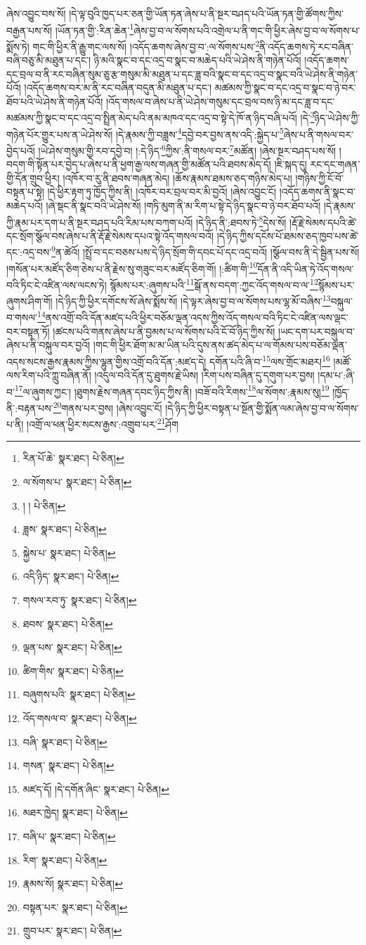 ཞེས་འབྱུང་བས་སོ། །དེ་ལྟ་བུའི་ཁྱད་པར་ཅན་གྱི་ཡོན་ཏན་ཞེས་པ་ནི་སྔར་བཤད་པའི་ཡོན་ཏན་གྱི་ཚོགས་ཀྱིས་བརྒྱན་པས་སོ། །ཡོན་ཏན་གྱི་:རིན་ཆེན་\footnote{རིན་པོ་ཆེ་  སྣར་ཐང་།  པེ་ཅིན། }ཞེས་བྱ་བ་ལ་སོགས་པའི་འགྲེལ་པ་ནི་གང་གི་ཕྱིར་ཞེས་བྱ་བ་ལ་སོགས་པ་སྨོས་ཏེ། གང་གི་ཕྱིར་ནི་རྒྱུ་གང་ལས་སོ། །འདོད་ཆགས་ཞེས་བྱ་བ་:ལ་སོགས་པས་\footnote{ལ་སོགས་པ་  སྣར་ཐང་།  པེ་ཅིན། }ནི་འདོད་ཆགས་ཏེ་རང་བཞིན་བཞི་བཅུ་མི་མཐུན་པ་དང་། ཉི་མའི་སྣང་བ་དང་འདྲ་བ་སྣང་བ་མཆེད་པའི་ཡེ་ཤེས་ནི་གཉེན་པོའོ། །འདོད་ཆགས་དང་བྲལ་བ་ནི་རང་བཞིན་སུམ་ཅུ་རྩ་གསུམ་མི་མཐུན་པ་དང་ཟླ་བའི་སྣང་བ་དང་འདྲ་བ་སྣང་བའི་ཡེ་ཤེས་ནི་གཉེན་པོའོ། །འདོད་ཆགས་བར་མ་ནི་རང་བཞིན་བདུན་མི་མཐུན་པ་དང་། མཚམས་ཀྱི་སྣང་བ་དང་འདྲ་བ་སྣང་བ་ཉེ་བར་ཐོབ་པའི་ཡེ་ཤེས་ནི་གཉེན་པོའོ། །འོད་གསལ་བ་ཞེས་པ་ནི་ཡེ་ཤེས་གསུམ་དང་བྲལ་བས་ཉི་མ་དང་ཟླ་བ་དང་མཚམས་ཀྱི་སྣང་བ་དང་འདྲ་བ་སྤྲིན་མེད་པའི་ནམ་མཁའ་དང་འདྲ་བ་སྟེ་དེ་ཁོ་ན་ཉིད་བཞི་པའོ། །དེ་\footnote{། །  པེ་ཅིན། }ཉིད་ཡེ་ཤེས་ཀྱི་གཉེན་པོར་གྱུར་པས་ན་ཡེ་ཤེས་སོ། །དེ་རྣམས་ཀྱི་བཟླས་\footnote{ཟླས་  སྣར་ཐང་།  པེ་ཅིན། }དབྱེ་བར་བྱས་ནས་འདི་:སྐྱེད་པ་\footnote{སྐྱེས་པ་  སྣར་ཐང་།  པེ་ཅིན། }ཞེས་པ་ནི་གསལ་བར་བྱེད་པའོ། །ཡེ་ཤེས་གསུམ་གྱི་རབ་དབྱེ་བ། །:དེ་ཉིད་\footnote{འདི་ཉིད་  སྣར་ཐང་།  པེ་ཅིན། }ཀྱིས་:ནི་གསལ་བར་\footnote{གསལ་རབ་ཏུ་  སྣར་ཐང་།  པེ་ཅིན། }མཚོན། །ཞེས་སྔར་བཤད་པས་སོ། །བདག་གི་སྟོན་པར་བྱེད་པ་ཞེས་པ་ནི་ཕྱག་རྒྱ་ལས་གཞན་གྱི་མཚོན་པའི་ཐབས་མེད་དོ། །ཇི་སྐད་དུ། རང་དང་གཞན་གྱི་དོན་གྲུབ་ཕྱིར། །འཁོར་བ་རུ་ནི་ཐབས་གཞན་མེད། །ཆོས་རྣམས་ཐམས་ཅད་གཉིས་མེད་པ། །གཉིས་ཀྱི་ངོ་བོ་བསྟན་པ་སྟེ། །དེ་ཕྱིར་རྟག་ཏུ་ཁྱོད་ཀྱིས་ནི། །འཁོར་བར་བྲལ་བར་མི་བྱའོ། །ཞེས་འབྱུང་ངོ། །འདོད་ཆགས་ནི་སྣང་བ་མཆེད་པའོ། །ཞེ་སྡང་ནི་སྣང་བའི་ཡེ་ཤེས་སོ། །གཏི་མུག་ནི་མ་རིག་པ་སྟེ་དེ་ཉིད་སྣང་བ་ཉེ་བར་ཐོབ་པའོ། །དེ་རྣམས་ཀྱི་རྣམ་པར་དག་པ་ནི་སྔར་བཤད་པའི་རིམ་པས་བཀག་པའོ། །དེ་ཉིད་ནི་:ཐབས་ཏེ་\footnote{ཐབས་  སྣར་ཐང་།  པེ་ཅིན། }དེས་སོ། །རྡོ་རྗེ་སེམས་དཔའི་ཚེ་དང་སྲོག་སྩོལ་བས་ཞེས་པ་ནི་རྡོ་རྗེ་སེམས་དཔའ་སྟེ་འོད་གསལ་བའོ། །དེ་ཉིད་ཀྱིས་དངོས་པོ་ཐམས་ཅད་ཁྱབ་པས་ཚེ་དང་:འདྲ་བས་\footnote{ལྡན་པས་  སྣར་ཐང་།  པེ་ཅིན། }ན་ཚེའོ། །སྤྲོ་བ་དང་བཅས་པས་དེ་ཉིད་སྲོག་གི་དབང་པོ་དང་འདྲ་བའོ། །སྩོལ་བས་ནི་དེ་སྦྱིན་པས་སོ། །གསོན་པར་མཛོད་ཅིག་ཅེས་པ་ནི་རྗེས་སུ་གཟུང་བར་མཛོད་ཅིག་གོ། །:ཚིག་གི་\footnote{ཚིག་གིས་  སྣར་ཐང་།  པེ་ཅིན། }དོན་ནི་འདི་ཡིན་ཏེ་འོད་གསལ་བའི་ཏིང་ངེ་འཛིན་ལས་ལངས་ཏེ། སྙོམས་པར་:ཞུགས་པའི་\footnote{བཞུགས་པའི་  སྣར་ཐང་།  པེ་ཅིན། }སྒོ་ནས་བདག་:ཀྱང་འོད་གསལ་བ་ལ་\footnote{འོད་གསལ་བ་  སྣར་ཐང་།  པེ་ཅིན། }སྙོམས་པར་ཞུགས་ཤིག་གོ། །དེ་ཉིད་ཀྱི་ཕྱིར་དགོངས་སོ་ཞེས་སྨོས་སོ། །དེ་ལྟར་ཞེས་བྱ་བ་ལ་སོགས་པས་ལྷ་མོ་བཞིས་\footnote{བཞི་  སྣར་ཐང་།  པེ་ཅིན། }བསྐུལ་བ་གསལ་\footnote{གསན་  སྣར་ཐང་།  པེ་ཅིན། }ནས་འགྲོ་བའི་དོན་མཛད་པའི་ཕྱིར་བཅོམ་ལྡན་འདས་ཀྱིས་འོད་གསལ་བའི་ཏིང་ངེ་འཛིན་ལས་ལྡང་བར་བསྟན་ཏོ། །ཚངས་པའི་གནས་ཞེས་པ་ནི་བྱམས་པ་ལ་སོགས་པའི་ངོ་བོ་ཉིད་ཀྱིས་སོ། །ཡང་དག་པར་བསྐུལ་བ་ཞེས་པ་ནི་བསྐུལ་བར་བྱའོ། །གང་གི་ཕྱིར་ཐོག་མ་མ་ཡིན་པའི་དུས་ནས་ཚད་མེད་པ་ལ་གོམས་པས་བཅོམ་ལྡན་འདས་སངས་རྒྱས་རྣམས་ཀྱིས་ལྷུན་གྱིས་འགྲོ་བའི་དོན་:མཛད་དེ། དགོན་པའི་ཞི་བ་\footnote{མཛད་དོ། །དེ་དགོན་ཞིང་  སྣར་ཐང་།  པེ་ཅིན། }ལས་གྲོང་མཐར།\footnote{མཐར་ཁྱེད།  སྣར་ཐང་།  པེ་ཅིན། } །མཚོ་ལས་རིག་པའི་ཀླུ་བཞིན་ནོ། །འདུལ་བའི་དོན་དུ་ཐུགས་རྗེ་ཡིས། །རིག་པས་བཞིན་དུ་དགུག་པར་བྱས། །དམ་པ་:ཞི་བ་\footnote{བཞི་པ་  སྣར་ཐང་།  པེ་ཅིན། }ལ་ཞུགས་ཀྱང་། །ཐུགས་རྗེས་གཞན་དབང་ཉིད་ཀྱིས་ནི། །བཟོ་བའི་རིགས་\footnote{རིག་  སྣར་ཐང་།  པེ་ཅིན། }ལ་སོགས་:རྣམས་སུ།\footnote{རྣམས་སོ།  སྣར་ཐང་།  པེ་ཅིན། } །ཁྱོད་ནི་:བརྟན་པས་\footnote{བསྟན་པར་  སྣར་ཐང་།  པེ་ཅིན། }གནས་པར་བྱས། །ཞེས་འབྱུང་ངོ། །དེ་ཉིད་ཀྱི་ཕྱིར་བསྟན་པ་སྔོན་གྱི་སྨོན་ལམ་ཞེས་བྱ་བ་ལ་སོགས་པ་ནི། །འགྲོ་ལ་ཕན་ཕྱིར་སངས་རྒྱས་:འགྲུབ་པར་\footnote{གྲུབ་པར་  སྣར་ཐང་།  པེ་ཅིན། }ཤོག 